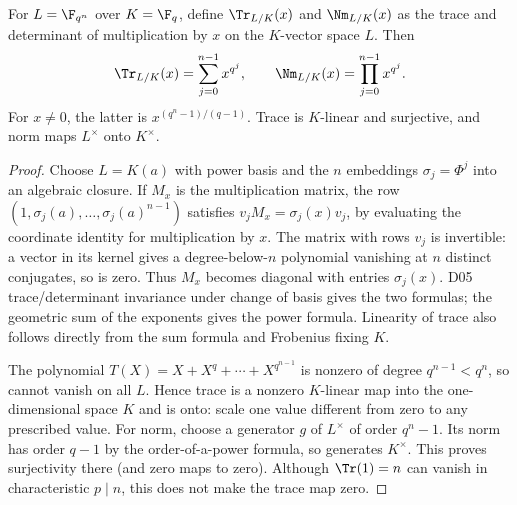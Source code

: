 \begin{theorem}
For $L=\F_{q^n}$ over $K=\F_q$, define $\Tr_{L/K}(x)$ and $\Nm_{L/K}(x)$ as the trace and determinant of multiplication by $x$ on the $K$-vector space $L$. Then
\[\Tr_{L/K}(x)=\sum_{j=0}^{n-1}x^{q^j},\qquad
\Nm_{L/K}(x)=\prod_{j=0}^{n-1}x^{q^j}.
\]
For $x\ne0$, the latter is $x^{(q^n-1)/(q-1)}$. Trace is $K$-linear and surjective, and norm maps $L^\times$ onto $K^\times$.
\end{theorem}
\begin{proof}
Choose $L=K(a)$ with power basis and the $n$ embeddings $\sigma_j=\Phi^j$ into an algebraic closure. If $M_x$ is the multiplication matrix, the row $(1,\sigma_j(a),\ldots,\sigma_j(a)^{n-1})$ satisfies $v_j M_x=\sigma_j(x)v_j$, by evaluating the coordinate identity for multiplication by $x$. The matrix with rows $v_j$ is invertible: a vector in its kernel gives a degree-below-$n$ polynomial vanishing at $n$ distinct conjugates, so is zero. Thus $M_x$ becomes diagonal with entries $\sigma_j(x)$. D05 trace/determinant invariance under change of basis gives the two formulas; the geometric sum of the exponents gives the power formula. Linearity of trace also follows directly from the sum formula and Frobenius fixing $K$.

The polynomial $T(X)=X+X^q+\cdots+X^{q^{n-1}}$ is nonzero of degree $q^{n-1}<q^n$, so cannot vanish on all $L$. Hence trace is a nonzero $K$-linear map into the one-dimensional space $K$ and is onto: scale one value different from zero to any prescribed value. For norm, choose a generator $g$ of $L^\times$ of order $q^n-1$. Its norm has order $q-1$ by the order-of-a-power formula, so generates $K^\times$. This proves surjectivity there (and zero maps to zero). Although $\Tr(1)=n$ can vanish in characteristic $p\mid n$, this does not make the trace map zero.
\end{proof}
